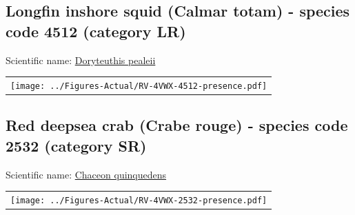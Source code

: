 \documentclass[12pt]{article}\usepackage[]{graphicx}\usepackage[]{color}
\begin{document}
\hypertarget{sec:4512}{%
\subsection{Longfin inshore squid (Calmar totam) - species code 4512 (category LR)}\label{sec:4512}}

  


Scientific name: \href{http://www.marinespecies.org/aphia.php?p=taxdetails\&id=574541}{Doryteuthis pealeii} \newline
\begin{minipage}{1.0\textwidth}
 \begin{tabular}{c}
\texttt{[image: ../Figures-Actual/RV-4VWX-4512-presence.pdf]} \\ 
\end{tabular} 
\end{minipage}
\clearpage

\renewcommand\thefigure{\thesubsection\Alph{figure}}

\setcounter{figure}{0}

\hypertarget{sec:2532}{%
\subsection{Red deepsea crab (Crabe rouge) - species code 2532 (category SR)}\label{sec:2532}}

  


Scientific name: \href{http://www.marinespecies.org/aphia.php?p=taxdetails\&id=158407}{Chaceon quinquedens} \newline
\begin{minipage}{1.0\textwidth}
 \begin{tabular}{c}
\texttt{[image: ../Figures-Actual/RV-4VWX-2532-presence.pdf]} \\ 
\end{tabular} 
\end{minipage}
\clearpage

\printindex
\end{document}
